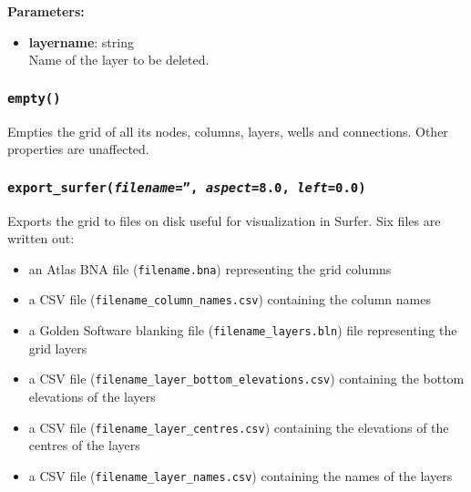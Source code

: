 \textbf{Parameters:}
\begin{itemize}
\item \textbf{layername}: string\\
  Name of the layer to be deleted.
\end{itemize}

\begin{snugshade}\subsubsection{\texttt{empty()}}\end{snugshade}
\label{sec:mulgrid:empty}

Empties the grid of all its nodes, columns, layers, wells and connections.  Other properties are unaffected.

\begin{snugshade}\subsubsection{\texttt{export\_surfer(\emph{filename}='', \emph{aspect}=8.0, \emph{left}=0.0)}}\end{snugshade}
\label{sec:mulgrid:export_surfer}

Exports the grid to files on disk useful for visualization in Surfer.  Six files are written out:

\begin{itemize}
\item an Atlas BNA file (\texttt{filename.bna}) representing the grid columns
\item a CSV file (\texttt{filename\_column\_names.csv}) containing the column names
\item a Golden Software blanking file (\texttt{filename\_layers.bln}) file representing the grid layers
\item a CSV file (\texttt{filename\_layer\_bottom\_elevations.csv}) containing the bottom elevations of the layers
\item a CSV file (\texttt{filename\_layer\_centres.csv}) containing the elevations of the centres of the layers
\item a CSV file (\texttt{filename\_layer\_names.csv}) containing the names of the layers
\end{itemize}

